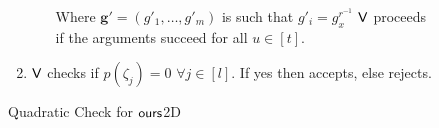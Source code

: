 \begin{figure}[h!]
\begin{framed}
\begin{enumerate}
\begin{itemize}
				Where $\bm{g}'= (g'_1, \ldots, g'_m)$ is such that $g'_i = g_x^{r^{-1}}$ 
				$\mathsf{V}$ proceeds if the arguments succeed for all $u \in [t]$.
			\end{itemize} 
			
			\item $\mathsf{V}$ checks if $p(\zeta_j)=0$ $\forall j\in[l]$. If yes then accepts, else rejects.
		\end{enumerate}
	\end{framed}
	\caption{Quadratic Check for $\textsf{ours}$2D}
\end{figure}

